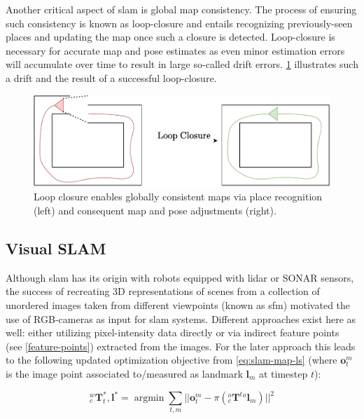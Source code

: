 \documentclass[headsepline, hidelinks, footsepline, footinclude=false, oneside, fontsize=11pt, paper=a4, listof=totoc, bibliography=totoc]{scrbook}
\DeclareMathOperator*{\argmin}{argmin}
\begin{document}
Another critical aspect of \gls{slam} is global map consistency. The process of ensuring such consistency is known as loop-closure and entails recognizing previously-seen places and updating the map once such a closure is detected.
Loop-closure is necessary for accurate map and pose estimates as even minor estimation errors will accumulate over time to result in large so-called drift errors.
\cref{fig:loop-closure} illustrates such a drift and the result of a successful loop-closure.

\begin{figure}[htbp]
\centering
\includegraphics[width=.9\linewidth]{figures/loop-closure.pdf}
\caption{\label{fig:loop-closure}Loop closure enables globally consistent maps via place recognition (left) and consequent map and pose adjustments (right).}
\end{figure}


\subsection{Visual SLAM \label{visual-slam}}
\label{sec:org4622bdd}

    Although \gls{slam} has its origin with robots equipped with \gls{lidar} or SONAR sensors, the success of recreating 3D representations of scenes from a collection of 
unordered images taken from different viewpoints \cite{agarwalBuildingRomeDay2011} (known as \gls{sfm}) motivated the use of RGB-cameras as input for \gls{slam} systems. 
Different approaches exist here as well: either utilizing pixel-intensity data directly \cite{engelLSDSLAMLargeScaleDirect2014,engelDirectSparseOdometry2018} or via indirect feature points (see \cref{feature-points})\cite{mur-artalORBSLAMVersatileAccurate2015a,mur-artalORBSLAM2OpenSourceSLAM2017} extracted from the images.
For the later approach this leads to the following updated optimization objective from \cref{eq:slam-map-ls} (where \(\mathbf{o}_{t}^{m}\) is the image point associated to/measured as landmark \(\mathbf{l}_m\) at timestep \(t\)):

\begin{equation}
\label{eq:slam-map-visual}
    {}^w_c\mathbf{T}_t^*, \mathbf{l}^* =  \argmin \sum_{t, m}||\mathbf{o}_{t}^{m} - \pi({}^{o}_{c}\mathbf{T}^{t}{}^{o}\mathbf{l}_{m})||^2
\end{equation}
\end{document}
